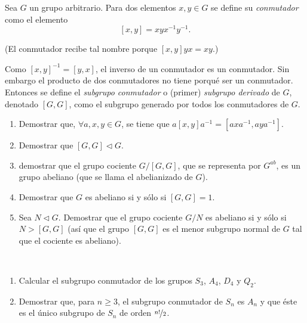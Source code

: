 \begin{ejercicio}
    Sea $G$ un grupo arbitrario. Para dos elementos $x,y\in G$ se define su \emph{conmutador} como el elemento
    \[
        [x,y] = xyx^{-1}y^{-1}.
    \]
    \begin{observacion}
        (El conmutador recibe tal nombre porque $[x,y]yx=xy$.)
    \end{observacion}
    
    Como $[x,y]^{-1}=[y,x]$, el inverso de un conmutador es un conmutador. Sin embargo el producto de dos conmutadores no tiene porqué ser un conmutador. Entonces se define el \emph{subgrupo conmutador} o (primer) \emph{subgrupo derivado} de $G$, denotado $[G,G]$, como el subgrupo generado por todos los conmutadores de $G$.
    \begin{enumerate}
        \item Demostrar que, $\forall a,x,y\in G$, se tiene que $a[x,y]a^{-1}=[axa^{-1},aya^{-1}]$.
        \item Demostrar que $[G,G]\lhd G$.
        \item demostrar que el grupo cociente $G/[G,G]$, que se representa por $G^{ab}$, es un grupo abeliano (que se llama el abelianizado de $G$).
        \item Demostrar que $G$ es abeliano si y sólo si $[G,G]=1$.
        \item Sea $N\lhd G$. Demostrar que el grupo cociente $G/N$ es abeliano si y sólo si $N>[G,G]$ (así que el grupo $[G,G]$ es el menor subgrupo normal de $G$ tal que el cociente es abeliano).
    \end{enumerate}
\end{ejercicio}

\begin{ejercicio}~
    \begin{enumerate}
        \item Calcular el subgrupo conmutador de los grupos $S_3$, $A_4$, $D_4$ y $Q_2$.
        \item Demostrar que, para $n\geq 3$, el subgrupo conmutador de $S_n$ es $A_n$ y que éste es el único subgrupo de $S_n$ de orden $\nicefrac{n!}{2}$.
    \end{enumerate}
\end{ejercicio}